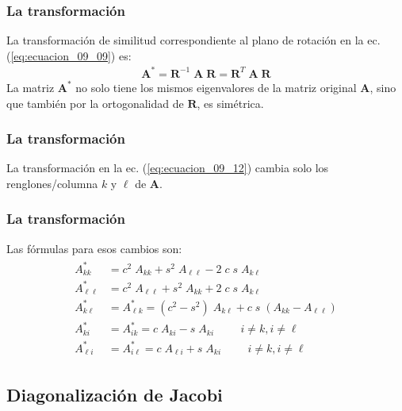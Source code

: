 \documentclass[12pt]{beamer}
\begin{document}
\begin{frame}
\frametitle{La transformación}
La transformación de similitud correspondiente al plano de rotación en la ec. (\ref{eq:ecuacion_09_09}) es:
\pause
\begin{align}
\mathbf{A}^{*} = \mathbf{R}^{-1} \; \mathbf{A \; R} = \mathbf{R}^{T} \; \mathbf{A \; R}
\label{eq:ecuacion_09_12}
\end{align}
\pause
La matriz $\mathbf{A}^{*}$ no solo tiene los mismos eigenvalores de la matriz original $\mathbf{A}$, sino que también por la ortogonalidad de $\mathbf{R}$, es simétrica.
\end{frame}
\begin{frame}
\frametitle{La transformación}
La transformación en la ec. (\ref{eq:ecuacion_09_12}) cambia solo los renglones/columna $k$ y $\ell$ de $\mathbf{A}$.
\end{frame}
\begin{frame}
\frametitle{La transformación}
Las fórmulas para esos cambios son:
\begin{align}
\begin{aligned}
A_{k k}^{*} &= c^{2} \; A_{k k} + s^{2} \; A_{\ell \ell} - 2 \; c \; s \; A_{k \ell} \\
A_{\ell \ell}^{*} &= c^{2} \; A_{\ell \ell} + s^{2} \; A_{k k} + 2 \; c \; s \; A_{k \ell} \\
A_{k \ell}^{*} &= A_{\ell k}^{*} = (c^{2} - s^{2}) \; A_{k \ell} + c \; s \; (A_{k k} - A_{\ell \ell}) \\
A_{k i}^{*} &= A_{i k}^{*} = c \; A_{k i } - s \; A_{k i} \hspace{1cm} i \neq k, i \neq \ell \\
A_{\ell i}^{*} &= A_{i \ell}^{*} = c \; A_{\ell i } + s \; A_{k i} \hspace{1cm} i \neq k, i \neq \ell
\end{aligned}
\label{eq:ecuacion_09_13}
\end{align}
\end{frame}

\subsection{Diagonalización de Jacobi}
\end{document}
